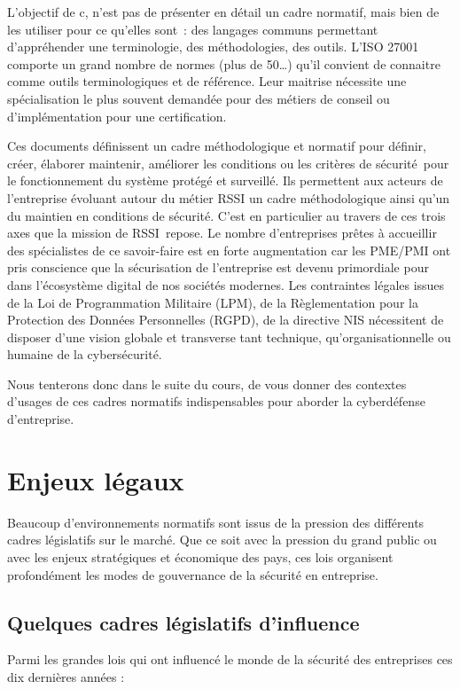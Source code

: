 \begin{nota}
L’objectif de c\edoc, n’est pas de présenter en détail un cadre normatif, mais bien de les utiliser pour ce qu’elles sont : des langages communs permettant d’appréhender une terminologie, des méthodologies, des outils. L’ISO 27001 comporte un grand nombre de normes (plus de 50…) qu’il convient de connaitre comme outils terminologiques et de référence. Leur maitrise nécessite une spécialisation le plus souvent demandée pour des métiers de conseil ou d’implémentation pour une certification.
\end{nota}

Ces documents définissent un cadre méthodologique et normatif pour définir, créer, élaborer maintenir, améliorer les conditions ou les critères de sécurité pour le fonctionnement du système protégé et surveillé. 
Ils permettent aux acteurs de l'entreprise évoluant autour du métier RSSI un cadre méthodologique ainsi qu’un  du maintien en conditions de sécurité. C’est en particulier au travers de ces trois axes que la mission de RSSI repose. 
Le nombre d’entreprises prêtes à accueillir des spécialistes de ce savoir-faire est en forte augmentation car les PME/PMI ont pris conscience que la sécurisation de l’entreprise est devenu primordiale pour  dans l’écosystème digital de nos sociétés modernes. Les contraintes légales issues de la Loi de Programmation Militaire (LPM), de la Règlementation pour la Protection des Données Personnelles (RGPD), de la directive NIS nécessitent de disposer d’une vision globale et transverse tant technique, qu'organisationnelle ou humaine de la cybersécurité.

Nous tenterons donc dans le suite du cours, de vous donner des contextes d'usages de ces cadres normatifs indispensables pour aborder la cyberdéfense d’entreprise. 

\section{Enjeux légaux}

Beaucoup d'environnements normatifs sont issus de la pression des différents cadres législatifs sur le marché. Que ce soit avec la pression du grand public ou avec les enjeux stratégiques et économique des pays, ces lois organisent profondément les modes de gouvernance de la sécurité en entreprise.

\subsection{Quelques cadres législatifs d'influence}
Parmi les grandes lois qui ont influencé  le monde de la sécurité des entreprises ces dix dernières années :

